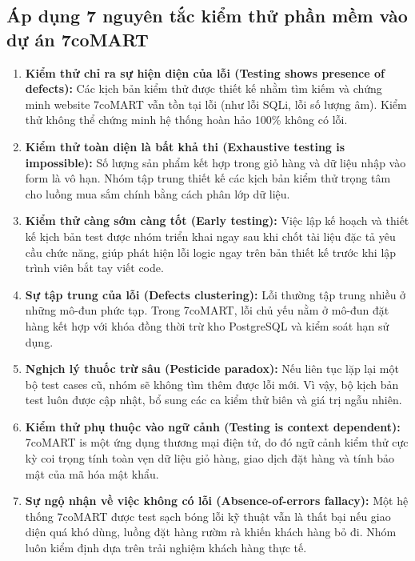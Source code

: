 \subsection{Áp dụng 7 nguyên tắc kiểm thử phần mềm vào dự án 7coMART}
\begin{enumerate}
    \item \textbf{Kiểm thử chỉ ra sự hiện diện của lỗi (Testing shows presence of defects):} Các kịch bản kiểm thử được thiết kế nhằm tìm kiếm và chứng minh website 7coMART vẫn tồn tại lỗi (như lỗi SQLi, lỗi số lượng âm). Kiểm thử không thể chứng minh hệ thống hoàn hảo 100\% không có lỗi.
    \item \textbf{Kiểm thử toàn diện là bất khả thi (Exhaustive testing is impossible):} Số lượng sản phẩm kết hợp trong giỏ hàng và dữ liệu nhập vào form là vô hạn. Nhóm tập trung thiết kế các kịch bản kiểm thử trọng tâm cho luồng mua sắm chính bằng cách phân lớp dữ liệu.
    \item \textbf{Kiểm thử càng sớm càng tốt (Early testing):} Việc lập kế hoạch và thiết kế kịch bản test được nhóm triển khai ngay sau khi chốt tài liệu đặc tả yêu cầu chức năng, giúp phát hiện lỗi logic ngay trên bản thiết kế trước khi lập trình viên bắt tay viết code.
    \item \textbf{Sự tập trung của lỗi (Defects clustering):} Lỗi thường tập trung nhiều ở những mô-đun phức tạp. Trong 7coMART, lỗi chủ yếu nằm ở mô-đun đặt hàng kết hợp với khóa đồng thời trừ kho PostgreSQL và kiểm soát hạn sử dụng.
    \item \textbf{Nghịch lý thuốc trừ sâu (Pesticide paradox):} Nếu liên tục lặp lại một bộ test cases cũ, nhóm sẽ không tìm thêm được lỗi mới. Vì vậy, bộ kịch bản test luôn được cập nhật, bổ sung các ca kiểm thử biên và giá trị ngẫu nhiên.
    \item \textbf{Kiểm thử phụ thuộc vào ngữ cảnh (Testing is context dependent):} 7coMART is một ứng dụng thương mại điện tử, do đó ngữ cảnh kiểm thử cực kỳ coi trọng tính toàn vẹn dữ liệu giỏ hàng, giao dịch đặt hàng và tính bảo mật của mã hóa mật khẩu.
    \item \textbf{Sự ngộ nhận về việc không có lỗi (Absence-of-errors fallacy):} Một hệ thống 7coMART được test sạch bóng lỗi kỹ thuật vẫn là thất bại nếu giao diện quá khó dùng, luồng đặt hàng rườm rà khiến khách hàng bỏ đi. Nhóm luôn kiểm định dựa trên trải nghiệm khách hàng thực tế.
\end{enumerate}

